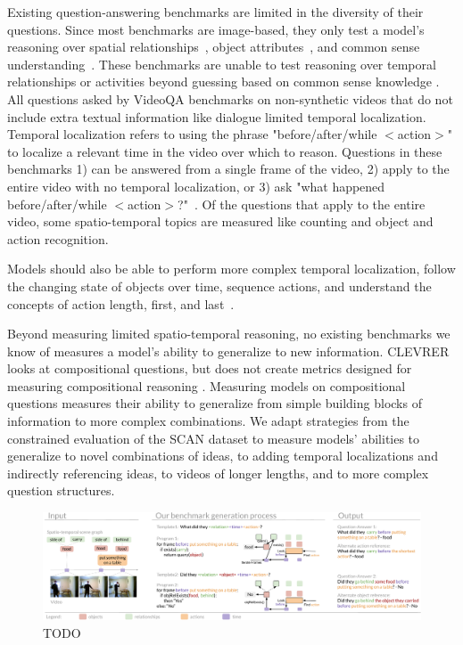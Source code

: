 Existing question-answering benchmarks are limited in the diversity of their questions. Since most benchmarks are image-based, they only test a model's reasoning over spatial relationships~\cite{johnson2017clevr,hudson2019gqa,antol2015vqa,goyal2017making,krishna2017visual,zhu2016visual7w}, object attributes~\cite{johnson2017clevr,hudson2019gqa, antol2015vqa,goyal2017making,krishna2017visual}, and common sense understanding~\cite{zellers2019recognition,antol2015vqa,krishna2017visual}. These benchmarks are unable to test reasoning over temporal relationships or activities beyond guessing based on common sense knowledge \cite{zellers2019recognition}. All questions asked by VideoQA benchmarks on non-synthetic videos that do not include extra textual information like dialogue limited temporal localization. Temporal localization refers to using the phrase "before/after/while $<$action$>$" to localize a relevant time in the video over which to reason. Questions in these benchmarks 1) can be answered from a single frame of the video, 2) apply to the entire video with no temporal localization, or 3) ask "what happened before/after/while $<$action$>$?"~\cite{jang2017tgif,xu2017video, maharaj2017dataset, zeng2016leveraging, yu2019activitynet}. Of the questions that apply to the entire video, some spatio-temporal topics are measured like counting and object and action recognition.


 
Models should also be able to perform more complex temporal localization, follow the changing state of objects over time, sequence actions, and understand the concepts of action length, first, and last~\cite{lake2018generalization,vatashsky2020vqa}.

Beyond measuring limited spatio-temporal reasoning, no existing benchmarks we know of measures a model's ability to generalize to new information. CLEVRER looks at compositional questions, but does not create metrics designed for measuring compositional reasoning \cite{yi2019clevrer}. Measuring models on compositional questions measures their ability to generalize from simple building blocks of information to more complex combinations. We adapt strategies from the constrained evaluation of the SCAN dataset \cite{lake2018generalization} to measure models' abilities to generalize to novel combinations of ideas, to adding temporal localizations and indirectly referencing ideas, to videos of longer lengths, and to more complex question structures.

\begin{figure}[t]
    \centering
    \includegraphics[width=0.95\linewidth]{figures/system.pdf}
    \caption{TODO}
    \label{fig:system}
\end{figure}
